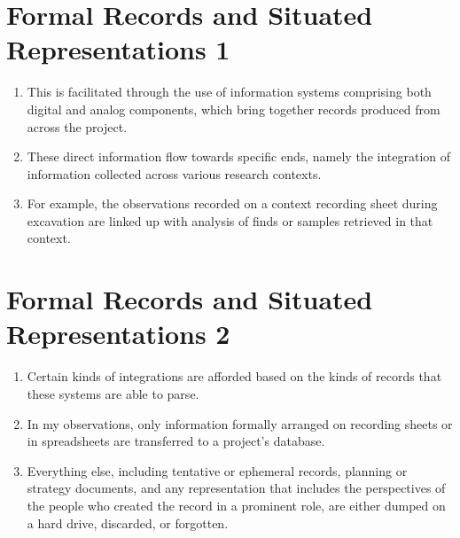 \documentclass[12pt]{article}
\begin{document}
\section{Formal Records and Situated Representations 1}
\begin{enumerate}
  \item This is facilitated through the use of information systems comprising both digital and analog components, which bring together records produced from across the project.
  \item These direct information flow towards specific ends, namely the integration of information collected across various research contexts.
  \item For example, the observations recorded on a context recording sheet during excavation are linked up with analysis of finds or samples retrieved in that context.
\end{enumerate}
  
\section{Formal Records and Situated Representations 2}
\begin{enumerate}
  \item Certain kinds of integrations are afforded based on the kinds of records that these systems are able to parse.
  \item In my observations, only information formally arranged on recording sheets or in spreadsheets are transferred to a project's database.
  \item Everything else, including tentative or ephemeral records, planning or strategy documents, and any representation that includes the perspectives of the people who created the record in a prominent role, are either dumped on a hard drive, discarded, or forgotten.
\end{enumerate}
\end{document}
